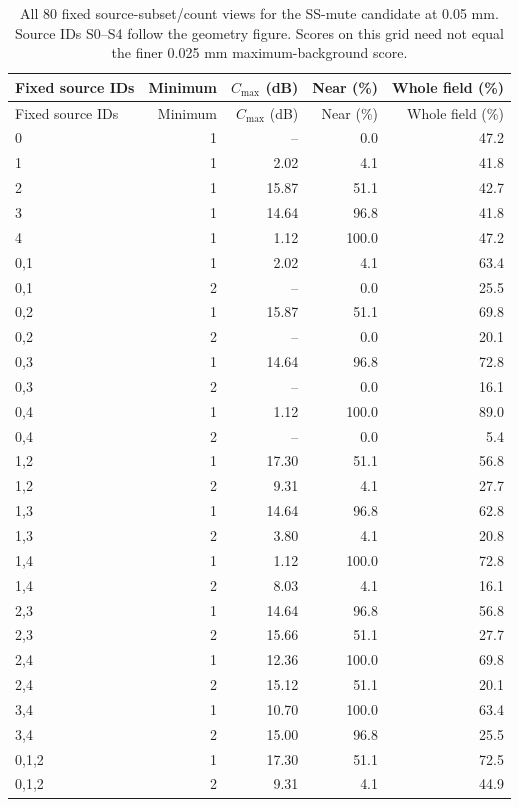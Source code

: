 \begingroup\small\setlength{\tabcolsep}{3pt}
\begin{longtable}{@{}lrrrr@{}}
\caption{All 80 fixed source-subset/count views for the SS-mute candidate at 0.05 mm. Source IDs S0--S4 follow the geometry figure. Scores on this grid need not equal the finer 0.025 mm maximum-background score.}\label{saftapp:source_register}\\
\toprule Fixed source IDs & Minimum & $C_{\max}$ (dB) & Near (\%) & Whole field (\%)\\\midrule\endfirsthead
\toprule Fixed source IDs & Minimum & $C_{\max}$ (dB) & Near (\%) & Whole field (\%)\\\midrule\endhead
0 & 1 & -- & 0.0 & 47.2\\
1 & 1 & 2.02 & 4.1 & 41.8\\
2 & 1 & 15.87 & 51.1 & 42.7\\
3 & 1 & 14.64 & 96.8 & 41.8\\
4 & 1 & 1.12 & 100.0 & 47.2\\
0,1 & 1 & 2.02 & 4.1 & 63.4\\
0,1 & 2 & -- & 0.0 & 25.5\\
0,2 & 1 & 15.87 & 51.1 & 69.8\\
0,2 & 2 & -- & 0.0 & 20.1\\
0,3 & 1 & 14.64 & 96.8 & 72.8\\
0,3 & 2 & -- & 0.0 & 16.1\\
0,4 & 1 & 1.12 & 100.0 & 89.0\\
0,4 & 2 & -- & 0.0 & 5.4\\
1,2 & 1 & 17.30 & 51.1 & 56.8\\
1,2 & 2 & 9.31 & 4.1 & 27.7\\
1,3 & 1 & 14.64 & 96.8 & 62.8\\
1,3 & 2 & 3.80 & 4.1 & 20.8\\
1,4 & 1 & 1.12 & 100.0 & 72.8\\
1,4 & 2 & 8.03 & 4.1 & 16.1\\
2,3 & 1 & 14.64 & 96.8 & 56.8\\
2,3 & 2 & 15.66 & 51.1 & 27.7\\
2,4 & 1 & 12.36 & 100.0 & 69.8\\
2,4 & 2 & 15.12 & 51.1 & 20.1\\
3,4 & 1 & 10.70 & 100.0 & 63.4\\
3,4 & 2 & 15.00 & 96.8 & 25.5\\
0,1,2 & 1 & 17.30 & 51.1 & 72.5\\
0,1,2 & 2 & 9.31 & 4.1 & 44.9\\

\end{longtable}
